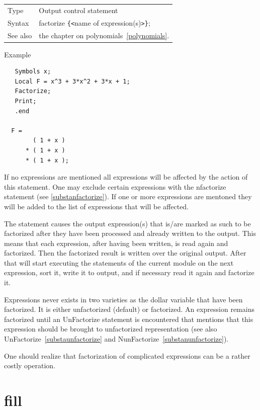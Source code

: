 \noindent \begin{tabular}{ll}
Type & Output control statement\\
Syntax & factorize \verb:{:{\tt<}name of expression(s){\tt>}\verb:}:;
\\ See also & the chapter on polynomials~\ref{polynomials}.
\end{tabular} \vspace{4mm}
\noindent Example
\begin{verbatim}
   Symbols x;
   Local F = x^3 + 3*x^2 + 3*x + 1;
   Factorize;
   Print;
   .end

  F =
        ( 1 + x )
      * ( 1 + x )
      * ( 1 + x );
\end{verbatim}
\noindent If no expressions are mentioned all expressions will be affected 
by the action of this statement. One may exclude certain expressions with 
the nfactorize statement (see \ref{substanfactorize}). If one or more 
expressions are mentoned they will be added to the list of expressions that 
will be affected.

\noindent The statement causes the output expression(s) that is/are marked 
as such to be factorized after they have been processed and already written 
to the output. This means that each expression, after having been written, 
is read again and factorized. Then the factorized result is written over 
the original output. After that \FORM{} will start executing the statements of 
the current module on the next expression, sort it, write it to output, and 
if necessary read it again and factorize it.

\noindent Expressions never exists in two varieties as the dollar variable 
that have been factorized. It is either unfactorized (default) or 
factorized. An expression remains factorized until an UnFactorize 
statement is encountered that mentions that this expression should be 
brought to unfactorized representation (see also 
UnFactorize~\ref{substaunfactorize} and 
NunFactorize~\ref{substanunfactorize}).

\noindent One should realize that factorization of complicated expressions 
can be a rather costly operation.

\vspace{10mm}


\section{fill}
\label{substafill}

